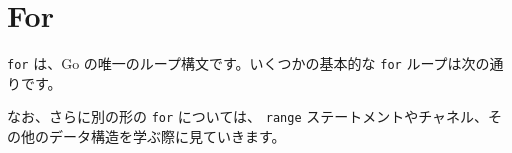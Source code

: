 \section{For}

\texttt{for} は、Go の唯一のループ構文です。いくつかの基本的な \texttt{for} ループは次の通りです。




なお、さらに別の形の \texttt{for} については、 \texttt{range} ステートメントやチャネル、その他のデータ構造を学ぶ際に見ていきます。